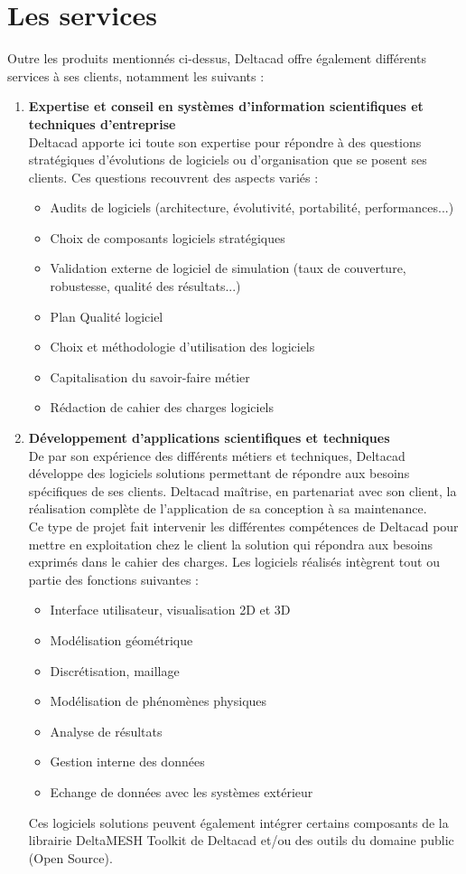 \section{Les services}
Outre les produits mentionnés ci-dessus, Deltacad offre également différents services à ses clients, notamment les suivants :
\begin{enumerate}
\item \textbf{Expertise et conseil en systèmes d'information scientifiques et techniques d'entreprise}\\ Deltacad apporte ici toute son expertise pour répondre à des questions stratégiques d'évolutions de logiciels ou d'organisation que se posent ses clients. Ces questions recouvrent des aspects variés :  
\begin{itemize}
\item Audits de logiciels (architecture, évolutivité, portabilité, performances...)
\item Choix de composants logiciels stratégiques
\item Validation externe de logiciel de simulation (taux de couverture, robustesse, qualité des résultats...)
\item Plan Qualité logiciel
\item Choix et méthodologie d'utilisation des logiciels
\item Capitalisation du savoir-faire métier
\item Rédaction de cahier des charges logiciels
\end{itemize}
\item \textbf{Développement d'applications scientifiques et techniques} \\
De par son expérience des différents métiers et techniques, Deltacad développe des logiciels solutions permettant de répondre aux besoins spécifiques de ses clients. Deltacad maîtrise, en partenariat avec son client, la réalisation complète de l'application de sa conception à sa maintenance.\\

Ce type de projet fait intervenir les différentes compétences de Deltacad pour mettre en exploitation chez le client la solution qui répondra aux besoins exprimés dans le cahier des charges. Les logiciels réalisés intègrent tout ou partie des fonctions suivantes :
\begin{itemize}
\item Interface utilisateur, visualisation 2D et 3D
\item Modélisation géométrique
\item Discrétisation, maillage
\item Modélisation de phénomènes physiques
\item Analyse de résultats
\item Gestion interne des données
\item Echange de données avec les systèmes extérieur
\end{itemize}
Ces logiciels solutions peuvent également intégrer certains composants de la librairie DeltaMESH Toolkit de Deltacad et/ou des outils du domaine public (Open Source).


\end{enumerate}
